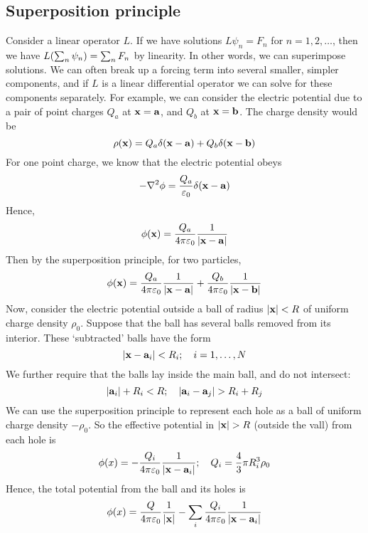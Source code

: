 \subsection{Superposition principle}
Consider a linear operator \(L\).
If we have solutions \(L \psi_n = F_n\) for \(n = 1, 2, \dots\), then we have \(L\qty(\sum_n \psi_n) = \sum_n F_n\) by linearity.
In other words, we can superimpose solutions.
We can often break up a forcing term into several smaller, simpler components, and if \(L\) is a linear differential operator we can solve for these components separately.
For example, we can consider the electric potential due to a pair of point charges \(Q_a\) at \(\vb x = \vb a\), and \(Q_b\) at \(\vb x = \vb b\).
The charge density would be
\[
	\rho(\vb x) = Q_a \delta(\vb x - \vb a) + Q_b \delta(\vb x - \vb b)
\]
For one point charge, we know that the electric potential obeys
\[
	-\laplacian{\phi} = \frac{Q_a}{\varepsilon_0} \delta(\vb x - \vb a)
\]
Hence,
\[
	\phi(\vb x) = \frac{Q_a}{4\pi \varepsilon_0} \frac{1}{\abs{\vb x - \vb a}}
\]
Then by the superposition principle, for two particles,
\[
	\phi(\vb x) = \frac{Q_a}{4\pi \varepsilon_0} \frac{1}{\abs{\vb x - \vb a}} + \frac{Q_b}{4\pi \varepsilon_0} \frac{1}{\abs{\vb x - \vb b}}
\]
Now, consider the electric potential outside a ball of radius \(\abs{\vb x} < R\) of uniform charge density \(\rho_0\).
Suppose that the ball has several balls removed from its interior.
These `subtracted' balls have the form
\[
	\abs{\vb x - \vb a_i} < R_i;\quad i = 1, \dots, N
\]
We further require that the balls lay inside the main ball, and do not intersect:
\[
	\abs{\vb a_i} + R_i < R;\quad \abs{\vb a_i - \vb a_j} > R_i + R_j
\]
We can use the superposition principle to represent each hole as a ball of uniform charge density \(-\rho_0\).
So the effective potential in \(\abs{\vb x} > R\) (outside the vall) from each hole is
\[
	\phi(x) = -\frac{Q_i}{4\pi\varepsilon_0} \frac{1}{\abs{\vb x - \vb a_i}};\quad Q_i = \frac{4}{3}\pi R_i^3 \rho_0
\]
Hence, the total potential from the ball and its holes is
\[
	\phi(x) = \frac{Q}{4\pi\varepsilon_0} \frac{1}{\abs{\vb x}} - \sum_i\frac{Q_i}{4\pi\varepsilon_0} \frac{1}{\abs{\vb x - \vb a_i}}
\]

